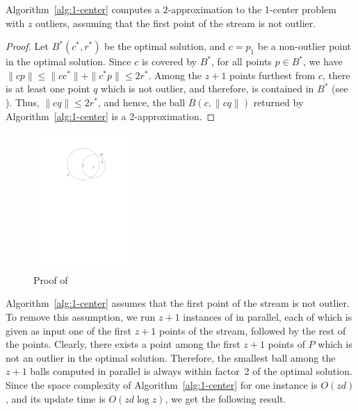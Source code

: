 \documentclass[envcountsame]{cls/cccg15}
\renewcommand{\O}{\ensuremath{{O}}}
\newcommand{\len}[1]{\|{#1}\|}
\newcommand{\lee}{\leqslant}
\renewcommand{\le}{\lee}
\begin{document}
\begin{theorem} \label{thm:1-center}
	Algorithm~\ref{alg:1-center} computes a $2$-approximation to
	the 1-center problem with $z$ outliers,
	assuming that the first point of the stream is not outlier. 
\end{theorem}


\begin{proof}
Let $B^*(c^*, r^*)$ be the optimal solution,
and $c = p_1$ be a non-outlier point in the optimal solution.
Since $c$ is covered by $B^*$,
for all points $p \in B^*$, we have
$\len{cp} \le \len{cc^*} + \len{c^*p} \le 2r^*$.
Among the $z+1$ points furthest from $c$,
there is at least one point $q$ which is not outlier, %
and therefore, is contained in $B^*$
(see ). 
Thus, $\len{cq} \le 2r^*$,
and hence, the ball $B(c, \len{cq})$ returned by Algorithm~\ref{alg:1-center} 
is a 2-approximation. 
\end{proof}


\begin{figure}[t]
	\centering
	\includegraphics[width=10em]{figs/one-center}
	\caption{Proof of }
	\label{fig:1center}
\end{figure}


\noindent
Algorithm~\ref{alg:1-center} 
assumes that the first point of the stream is not outlier.
To remove this assumption,
we run $z+1$ instances of  in parallel,
each of which is given as input one of the first $z + 1$ points of the stream,
followed by the rest of the points.
Clearly, there exists a point among the first $z+1$ points of $P$
which is not an outlier in the optimal solution.
Therefore, the smallest ball among the $z+1$ balls computed in parallel
is always within factor~2 of the optimal solution. %
Since the space complexity of Algorithm~\ref{alg:1-center} for one instance is $\O(zd)$, 
and its update time is $\O (zd \log z)$, %
we get the following result.
\end{document}

